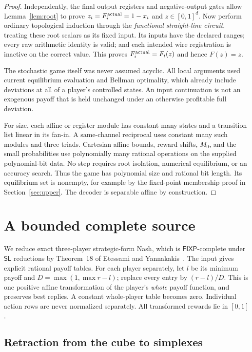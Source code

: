 \documentclass[11pt,a4paper]{article}
\numberwithin{equation}{section}
\theoremstyle{definition}
\newcommand{\FIXP}{\mathsf{FIXP}}
\newcommand{\SL}{\mathsf{SL}}
\begin{document}
\begin{proof}
Independently, the final output registers and negative-output gates
allow Lemma~\ref{lem:root} to prove \(z_i=F_i^{\rm actual}=1-x_i\)
and \(z\in[0,1]^d\). Now perform ordinary topological induction through
the \emph{functional straight-line circuit}, treating these root
scalars as its fixed input. Its inputs have the declared ranges; every
raw arithmetic identity is valid; and each intended wire registration
is inactive on the correct value. This proves
\(F_i^{\rm actual}=F_i(z)\) and hence \(F(z)=z\).

The stochastic game itself was never assumed acyclic. All local
arguments used current equilibrium evaluation and Bellman optimality,
which already include deviations at all of a player's controlled
states. An input continuation is not an exogenous payoff that is held
unchanged under an otherwise profitable full deviation.

For size, each affine or register module has constant many states and
a transition list linear in its fan-in. A same-channel reciprocal uses
constant many such modules and three triads. Cartesian affine bounds,
reward shifts, \(M_0\), and the small probabilities use polynomially
many rational operations on the supplied polynomial-bit data. No step
requires root isolation, numerical equilibrium, or an accuracy search.
Thus the game has polynomial size and rational bit length. Its
equilibrium set is nonempty, for example by the fixed-point membership
proof in Section~\ref{sec:upper}. The decoder is separable affine by
construction.
\end{proof}

\section{A bounded complete source}\label{sec:source}

We reduce exact three-player strategic-form Nash, which is
\(\FIXP\)-complete under \(\SL\) reductions by Theorem~18 of
Etessami and Yannakakis~\cite{EY}. The input gives explicit rational
payoff tables. For each player separately, let \(l\) be its minimum
payoff and \(D=\max(1,\max r-l)\); replace every entry by \((r-l)/D\).
This is one positive affine transformation of the player's \emph{whole}
payoff function, and preserves best replies. A constant whole-player
table becomes zero. Individual action rows are never normalized
separately. All transformed rewards lie in \([0,1]\).

\subsection{Retraction from the cube to simplexes}
\end{document}
